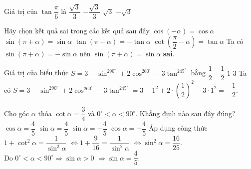 			
				\begin{ex}%
					Giá trị của $\tan\dfrac{\pi}{6}$ là
					\choice
					{\True $\dfrac{\sqrt{3}}{3}$}
					{$-\dfrac{\sqrt{3}}{3}$}
					{$\sqrt{3}$}
					{$-\sqrt{3}$}
				\end{ex}
				
			
				\begin{ex}%
					Hãy chọn kết quả sai trong các kết quả sau đây
					\choice
					{$\cos\left(-\alpha\right)=\cos\alpha $}
					{\True $\sin\left(\pi+\alpha\right)=\sin\alpha $}
					{$\tan\left(\pi-\alpha\right)=-\tan\alpha $}
					{$\cot\left(\dfrac{\pi}{2}-\alpha\right)=\tan\alpha $}
					\loigiai
					{Ta có $\sin\left(\pi+\alpha\right)=-\sin\alpha $ nên $\sin\left(\pi+\alpha\right)=\sin\alpha $ {\bf sai}.}
				\end{ex}
				
			
				
				\begin{ex}%
					Giá trị của biểu thức $ S=3-\sin^290^\circ+2\cos^260^\circ-3\tan^245^\circ $ bằng
					\choice
					{$\dfrac{1}{2}$}
					{\True $-\dfrac{1}{2}$}
					{$ 1$}
					{$ 3$}
					\loigiai
					{Ta có $ S=3-\sin^290^\circ+2\cos^260^\circ-3\tan^245^\circ =3-1^2+2\cdot \left(\dfrac{1}{2}\right)^2-3\cdot 1^2=-\dfrac{1}{2}$.}
				\end{ex}
				
			
		
				\begin{ex}%
					Cho góc $\alpha $ thỏa $\cot\alpha=\dfrac{3}{4}$ và $0^\circ<\alpha <90^\circ$. Khẳng định nào sau đây đúng?
					\choice
					{$\cos\alpha=\dfrac{4}{5}$}
					{\True $\sin\alpha=\dfrac{4}{5}$}
					{$\sin\alpha=-\dfrac{4}{5}$}
					{$\cos\alpha=-\dfrac{4}{5}$}
					\loigiai
					{Áp dụng công thức $ 1+\cot^2\alpha=\dfrac{1}{\sin^2\alpha}$ $\Leftrightarrow 1+\dfrac{9}{16}=\dfrac{1}{\sin^2\alpha}$ $\Leftrightarrow{\sin^2}\alpha=\dfrac{16}{25}$.\\
					Do $0^\circ<\alpha <90^\circ\Rightarrow\sin\alpha >0$ $\Rightarrow\sin\alpha=\dfrac{4}{5}$.}
				\end{ex}
				
			
							
